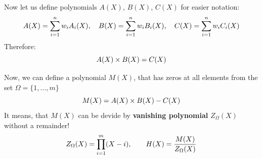 \documentclass{zkdl-presentation-template}
\begin{document}
    \begin{frame}
        Now let us define polynomials $A(X)$, $B(X)$, $C(X)$ for easier notation: 
        \vspace{-5pt}
        \begin{equation*}
            A(X) = \sum_{i = 1}^{n} w_iA_i(X), \quad B(X) = \sum_{i = 1}^{n} w_iB_i(X), \quad C(X) = \sum_{i = 1}^{n} w_iC_i(X)
            \vspace{-5pt}
        \end{equation*}
        \pause  
        Therefore:
        \vspace{-5pt}
        \begin{equation*}
            A(X) \times B(X) = C(X)
            \vspace{-5pt}
        \end{equation*}

        Now, we can define a polynomial $M(X)$, that has zeros at all elements from the set
        $\Omega = \{1,\dots,m\}$
        \vspace{-5pt}
        \begin{equation*}
            M(X) = A(X) \times B(X) - C(X)
            \vspace{-5pt}
        \end{equation*}
        \pause
        It means, that $M(X)$ can be devide by \textbf{vanishing polynomial} $Z_{\Omega}(X)$ without a remainder!
        \vspace{-8pt}
        \begin{equation*}
            Z_{\Omega}(X) = \prod_{i=1}^m (X - i), \qquad H(X) = \frac{M(X)}{Z_{\Omega}(X)}
            \vspace{-5pt}
        \end{equation*}
    \end{frame}
\end{document}
